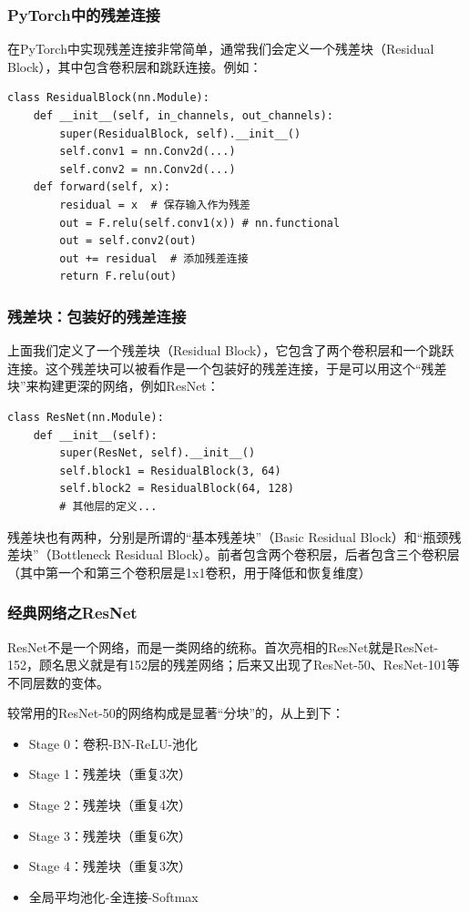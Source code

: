 \documentclass[fontset=none]{ctexbeamer}
\begin{document}
\begin{frame}[fragile]
    \frametitle{PyTorch中的残差连接}

在PyTorch中实现残差连接非常简单，通常我们会定义一个残差块（Residual Block），其中包含卷积层和跳跃连接。例如：
\begin{verbatim}
class ResidualBlock(nn.Module):
    def __init__(self, in_channels, out_channels):
        super(ResidualBlock, self).__init__()
        self.conv1 = nn.Conv2d(...)
        self.conv2 = nn.Conv2d(...)
    def forward(self, x):
        residual = x  # 保存输入作为残差
        out = F.relu(self.conv1(x)) # nn.functional
        out = self.conv2(out)
        out += residual  # 添加残差连接
        return F.relu(out)
\end{verbatim}    

\end{frame}

\begin{frame}[fragile]
    \frametitle{残差块：包装好的残差连接}
    上面我们定义了一个残差块（Residual Block），它包含了两个卷积层和一个跳跃连接。这个残差块可以被看作是一个包装好的残差连接，于是可以用这个“残差块”来构建更深的网络，例如ResNet：
\begin{verbatim}
class ResNet(nn.Module):
    def __init__(self):
        super(ResNet, self).__init__()
        self.block1 = ResidualBlock(3, 64)
        self.block2 = ResidualBlock(64, 128)
        # 其他层的定义...
\end{verbatim}
残差块也有两种，分别是所谓的“基本残差块”（Basic Residual Block）和“瓶颈残差块”（Bottleneck Residual Block）。前者包含两个卷积层，后者包含三个卷积层（其中第一个和第三个卷积层是1x1卷积，用于降低和恢复维度）
\end{frame}

\begin{frame}
    \frametitle{经典网络之ResNet}

    ResNet不是一个网络，而是一类网络的统称。首次亮相的ResNet就是ResNet-152，顾名思义就是有152层的残差网络；后来又出现了ResNet-50、ResNet-101等不同层数的变体。

    较常用的ResNet-50的网络构成是显著“分块”的，从上到下：
\begin{itemize}
    \item Stage 0：卷积-BN-ReLU-池化
    \item Stage 1：残差块（重复3次）
    \item Stage 2：残差块（重复4次）
    \item Stage 3：残差块（重复6次）
    \item Stage 4：残差块（重复3次）
    \item 全局平均池化-全连接-Softmax
\end{itemize}
\end{frame}
\end{document}
